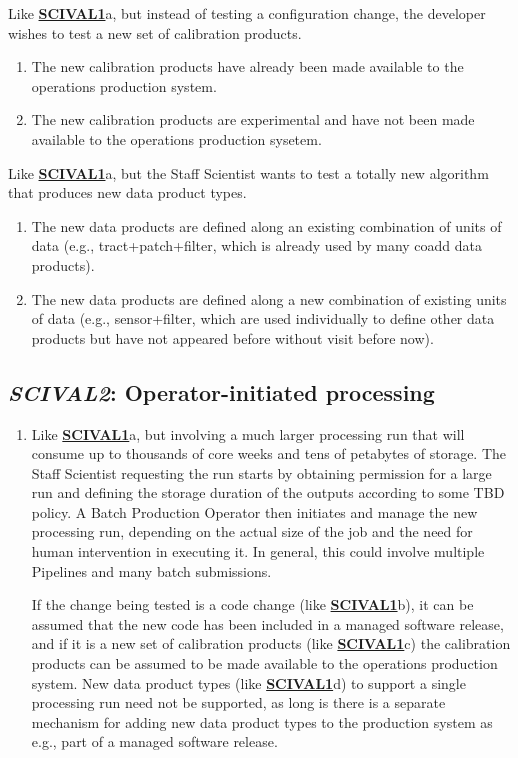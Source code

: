 \documentclass[DM,toc,lsstdraft]{lsstdoc}
\newcommand{\usecase}[3]{%
\subsection{\emph{#1}: #2}
\label{use:#1}
\begin{enumerate}[label=\alph*.]
#3
\end{enumerate}
}
\newcommand{\useref}[1]{\hyperref[use:#1]{\textcolor{lsstblue}{\textbf{#1}}}}
\begin{document}
{\item
Like \useref{SCIVAL1}a, but instead of testing a configuration change, the developer wishes to test a new set of calibration products.
\begin{enumerate}
\item The new calibration products have already been made available to the operations production system.
\item The new calibration products are experimental and have not been made available to the operations production sysetem.
\end{enumerate}

\item
Like \useref{SCIVAL1}a, but the Staff Scientist wants to test a totally new algorithm that produces new data product types.
\begin{enumerate}
\item The new data products are defined along an existing combination of units of data (e.g., tract+patch+filter, which is already used by many coadd data products).
\item The new data products are defined along a new combination of existing units of data (e.g., sensor+filter, which are used individually to define other data products but have not appeared before without visit before now).
\end{enumerate}

}

\usecase{SCIVAL2}{Operator-initiated processing}{%

\item
Like \useref{SCIVAL1}a, but involving a much larger processing run that will consume up to thousands of core weeks and tens of petabytes of storage.
The Staff Scientist requesting the run starts by obtaining permission for a large run and defining the storage duration of the outputs according to some TBD policy.
A Batch Production Operator then initiates and manage the new processing run, depending on the actual size of the job and the need for human intervention in executing it.
In general, this could involve multiple Pipelines and many batch submissions.

If the change being tested is a code change (like \useref{SCIVAL1}b), it can be assumed that the new code has been included in a managed software release, and if it is a new set of calibration products (like \useref{SCIVAL1}c) the calibration products can be assumed to be made available to the operations production system.
New data product types (like \useref{SCIVAL1}d) to support a single processing run need not be supported, as long is there is a separate mechanism for adding new data product types to the production system as e.g., part of a managed software release.

}
\end{document}
